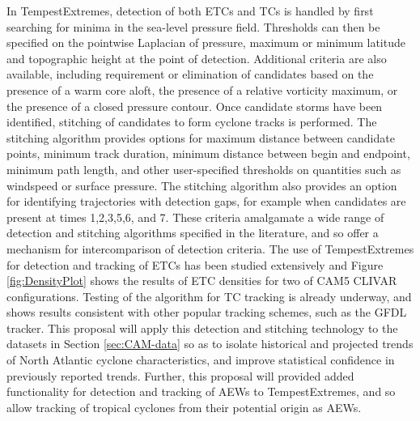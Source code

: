 \documentclass[11pt]{article}
\begin{document}
In TempestExtremes, detection of both ETCs and TCs is handled by first searching for minima in the sea-level pressure field.  Thresholds can then be specified on the pointwise Laplacian of pressure, maximum or minimum latitude and topographic height at the point of detection.  Additional criteria are also available, including requirement or elimination of candidates based on the presence of a warm core aloft, the presence of a relative vorticity maximum, or the presence of a closed pressure contour.  Once candidate storms have been identified, stitching of candidates to form cyclone tracks is performed.  The stitching algorithm provides options for maximum distance between candidate points, minimum track duration, minimum distance between begin and endpoint, minimum path length, and other user-specified thresholds on quantities such as windspeed or surface pressure.  The stitching algorithm also provides an option for identifying trajectories with detection gaps, for example when candidates are present at times 1,2,3,5,6, and 7.  These criteria amalgamate a wide range of detection and stitching algorithms specified in the literature, and so offer a mechanism for intercomparison of detection criteria.  The use of TempestExtremes for detection and tracking of ETCs has been studied extensively and Figure \ref{fig:DensityPlot} shows the results of ETC densities for two of CAM5 CLIVAR configurations.  Testing of the algorithm for TC tracking is already underway, and shows results consistent with other popular tracking schemes, such as the GFDL tracker. This proposal will apply this detection and stitching technology to the datasets in Section \ref{sec:CAM-data} so as to isolate historical and projected trends of North Atlantic cyclone characteristics, and improve statistical confidence in previously reported trends.  Further, this proposal will provided added functionality for detection and tracking of AEWs to TempestExtremes, and so allow tracking of tropical cyclones from their potential origin as AEWs.
\end{document}
